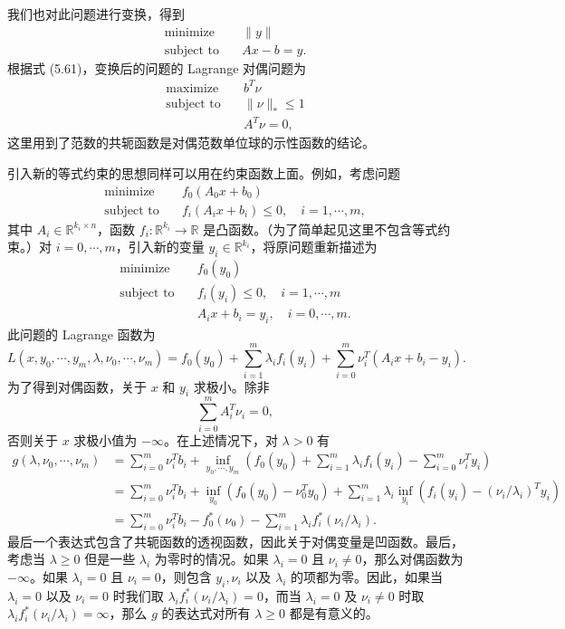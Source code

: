 \documentclass[UTF8,12pt,a4paper,fontset=fandol]{ctexart}
\begin{document}
我们也对此问题进行变换，得到
\[
\begin{aligned}
\text{minimize}\quad & \|y\|\\
\text{subject to}\quad & Ax-b=y.
\end{aligned}
\]
根据式 (5.61)，变换后的问题的 Lagrange 对偶问题为
\begin{equation}
\begin{aligned}
\text{maximize}\quad & b^T\nu\\
\text{subject to}\quad & \|\nu\|_\ast\leq 1\\
& A^T\nu=0,
\end{aligned}
\tag{5.64}
\end{equation}
这里用到了范数的共轭函数是对偶范数单位球的示性函数的结论。

引入新的等式约束的思想同样可以用在约束函数上面。例如，考虑问题
\begin{equation}
\begin{aligned}
\text{minimize}\quad & f_0(A_0x+b_0)\\
\text{subject to}\quad & f_i(A_ix+b_i)\leq 0,\quad i=1,\cdots,m,
\end{aligned}
\tag{5.65}
\end{equation}
其中 $A_i\in\mathbb{R}^{k_i\times n}$，函数 $f_i:\mathbb{R}^{k_i}\to\mathbb{R}$ 是凸函数。（为了简单起见这里不包含等式约束。）对 $i=0,\cdots,m$，引入新的变量 $y_i\in\mathbb{R}^{k_i}$，将原问题重新描述为
\begin{equation}
\begin{aligned}
\text{minimize}\quad & f_0(y_0)\\
\text{subject to}\quad & f_i(y_i)\leq 0,\quad i=1,\cdots,m\\
& A_ix+b_i=y_i,\quad i=0,\cdots,m.
\end{aligned}
\tag{5.66}
\end{equation}
此问题的 Lagrange 函数为
\[
L(x,y_0,\cdots,y_m,\lambda,\nu_0,\cdots,\nu_m)
=f_0(y_0)+\sum_{i=1}^m\lambda_i f_i(y_i)
+\sum_{i=0}^m\nu_i^T(A_ix+b_i-y_i).
\]
为了得到对偶函数，关于 $x$ 和 $y_i$ 求极小。除非
\[
\sum_{i=0}^m A_i^T\nu_i=0,
\]
否则关于 $x$ 求极小值为 $-\infty$。在上述情况下，对 $\lambda>0$ 有
\[
\begin{aligned}
g(\lambda,\nu_0,\cdots,\nu_m)
&=\sum_{i=0}^m\nu_i^Tb_i+\inf_{y_0,\cdots,y_m}
\left(f_0(y_0)+\sum_{i=1}^m\lambda_i f_i(y_i)-\sum_{i=0}^m\nu_i^Ty_i\right)\\
&=\sum_{i=0}^m\nu_i^Tb_i+\inf_{y_0}(f_0(y_0)-\nu_0^Ty_0)
+\sum_{i=1}^m\lambda_i\inf_{y_i}\left(f_i(y_i)-(\nu_i/\lambda_i)^Ty_i\right)\\
&=\sum_{i=0}^m\nu_i^Tb_i-f_0^\ast(\nu_0)-\sum_{i=1}^m\lambda_i f_i^\ast(\nu_i/\lambda_i).
\end{aligned}
\]
最后一个表达式包含了共轭函数的透视函数，因此关于对偶变量是凹函数。最后，考虑当 $\lambda\geq 0$ 但是一些 $\lambda_i$ 为零时的情况。如果 $\lambda_i=0$ 且 $\nu_i\neq 0$，那么对偶函数为 $-\infty$。如果 $\lambda_i=0$ 且 $\nu_i=0$，则包含 $y_i,\nu_i$ 以及 $\lambda_i$ 的项都为零。因此，如果当 $\lambda_i=0$ 以及 $\nu_i=0$ 时我们取 $\lambda_i f_i^\ast(\nu_i/\lambda_i)=0$，而当 $\lambda_i=0$ 及 $\nu_i\neq 0$ 时取 $\lambda_i f_i^\ast(\nu_i/\lambda_i)=\infty$，那么 $g$ 的表达式对所有 $\lambda\geq 0$ 都是有意义的。
\end{document}
